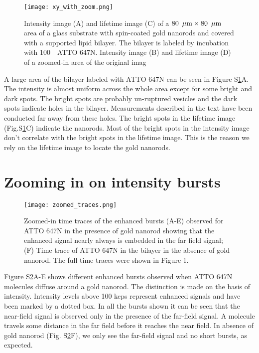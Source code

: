 \begin{figure}[ht]
  \centering
  \texttt{[image: xy\_with\_zoom.png]}
  \makeatletter
  \renewcommand{\fnum@figure}{\figurename~S\thefigure}
  \makeatother{}
  \caption{ Intensity image (A) and lifetime image (C) of a $80~\,\mu\textrm{m}\times80~\,\mu\textrm{m}$ area of a glass substrate with spin-coated gold nanorods and covered with a supported lipid bilayer. The bilayer is labeled by incubation with 100~\nM~ATTO 647N. Intensity image (B) and lifetime image (D) of a zoomed-in area of the original imag}
  \label{SIfig:xy-scan}
\end{figure}

A large area of the bilayer labeled with ATTO 647N can be seen in Figure S\ref{SIfig:xy-scan}A. The intensity is almost uniform across the whole area except for some bright and dark spots. The bright spots are
probably un-ruptured vesicles and the dark spots indicate holes in the bilayer. Measurements
described in the text have been conducted far away from these holes. The bright spots in the
lifetime image (Fig.S\ref{SIfig:xy-scan}C) indicate the nanorods. Most of the bright spots in the intensity image don't correlate with the bright spots in the lifetime image. This is the reason we rely on the
lifetime image to locate the gold nanorods.\\

\newpage
\section{Zooming in on intensity bursts}
\begin{figure}[ht]
  \centering
  \texttt{[image: zoomed\_traces.png]}
  \makeatletter
  \renewcommand{\fnum@figure}{\figurename~S\thefigure}
  \makeatother{}
  \caption{Zoomed-in time traces of the enhanced bursts (A-E) observed for ATTO 647N in the presence of gold nanorod showing that the enhanced signal nearly always is embedded in the far field signal; (F) Time trace of ATTO 647N in the bilayer in the absence of gold nanorod. The full time traces were shown in Figure 1.}
  \label{SIfig:zoomed-trace}
\end{figure}
Figure S\ref{SIfig:zoomed-trace}A-E shows different enhanced bursts observed when ATTO 647N molecules diffuse around a gold nanorod. The distinction is made on the basis of intensity. Intensity levels above 100 kcps represent enhanced signals and have been marked by a dotted box. In all the bursts shown it can be seen that the near-field signal is observed only in the presence of the far-field signal. A molecule travels some distance in the far field before it reaches the near field. In absence of gold nanorod (Fig. S\ref{SIfig:zoomed-trace}F), we only see the far-field signal and no short bursts, as expected.\\
\newpage

